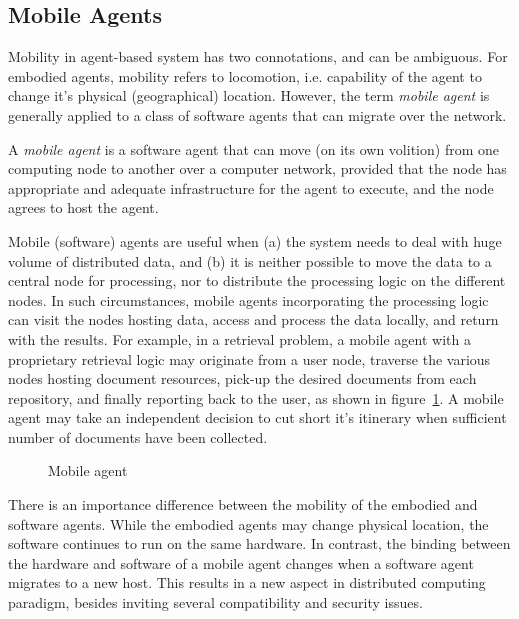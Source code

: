 \subsection{Mobile Agents}

Mobility in agent-based system has two connotations, and can be ambiguous. For embodied agents, mobility refers to 
locomotion, i.e. capability of the agent to change it's physical (geographical) location. However, the term {\em mobile
agent} is generally applied to a class of software agents that can migrate over the network. 

\begin{definition} 
	A {\em mobile agent} is a software agent that can move (on its own volition) from one computing node to another
	over a computer network, provided that the node has appropriate and adequate infrastructure for the agent to execute, 
	and the node agrees to host the agent.
\end{definition}

Mobile (software) agents are useful when (a) the system needs to deal with huge volume of distributed data, and (b) it is neither 
possible to move the data to a central node for processing, nor to distribute the processing logic on the different nodes. In such
circumstances, mobile agents incorporating the processing logic can visit the nodes hosting data, access and process the data locally, 
and return with the results. For example, in a retrieval problem, a mobile agent with a proprietary retrieval logic may originate 
from a user node, traverse the various nodes hosting document resources, pick-up the desired documents from each repository, 
and finally reporting back to the user, as shown in figure~\ref{fig:agents:mobile}. A mobile agent may take an independent
decision to cut short it's itinerary when sufficient number of documents have been collected.  

\begin{figure}[!htbp]
	\centerline{
	}
	\caption{Mobile agent}
	\label{fig:agents:mobile}
\end{figure}

There is an importance difference between the mobility of the embodied and software agents. While the embodied agents may change 
physical location, the software continues to run on the same hardware. In contrast, the binding between the hardware and software 
of a mobile agent changes  when a software agent migrates to a new host. This results in a new aspect in distributed computing
paradigm, besides inviting several compatibility and security issues.
